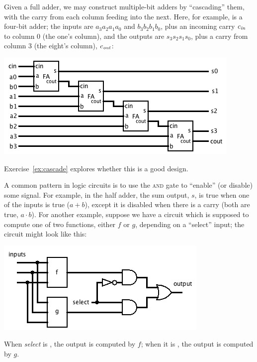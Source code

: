 Given a full adder, we may construct multiple-bit adders by ``cascading'' them, with the carry from each column feeding into the next. Here, for example, is a four-bit adder; the inputs are $a_3a_2a_1a_0$ and $b_3b_2b_1b_0$, plus an incoming carry $c_\textit{\scriptsize in}$ to column 0 (the one's column), and the outputs are $s_3s_2s_1s_0$, plus a carry from column 3 (the eight's column), $c_\textit{\scriptsize out}$:
\begin{center}
\includegraphics[width=!,height=!,scale=0.75]{graphics/4BitAdder.png}
\end{center}
Exercise~\ref{ex:cascade} explores whether this is a good design.

A common pattern in logic circuits is to use the \textsc{and} gate to ``enable'' (or disable) some signal. For example, in the half adder, the sum output, $s$, is true when one of the inputs is true ($a+b$), except it is disabled when there is a carry (both are true, $a\cdot b$). For another example, suppose we have a circuit which is supposed to compute one of two functions, either $f$ or $g$, depending on a ``select'' input; the circuit might look like this:
\begin{center}
\includegraphics[width=!,height=!,scale=0.75]{graphics/ForG.png}
\end{center}
When \textit{select} is \0, the output is computed by $f$; when it is \1, the output is computed by $g$.


